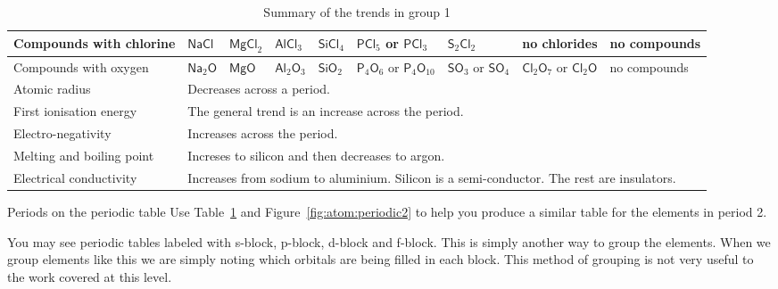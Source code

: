 \begin{table}[H]
 \begin{center}
  \begin{tabular}{|p{2cm}|l|l|l|l|l|l|l|l|} \hline
   Compounds with chlorine & $\mathsf{NaCl}$ & $\mathsf{MgCl}_2$ & $\mathsf{AlCl}_{3}$ & $\mathsf{SiCl}_{4}$ & $\mathsf{PCl}_{5}$ or $\mathsf{PCl}_{3}$ & $\mathsf{S}_{2}\mathsf{Cl}_{2}$ & no chlorides & no compounds \\ \hline
Compounds with oxygen & $\mathsf{Na}_{2}\mathsf{O}$ & $\mathsf{MgO}$ & $\mathsf{Al}_{2}\mathsf{O}_{3}$ & $\mathsf{SiO}_{2}$ & $\mathsf{P}_{4}\mathsf{O}_{6}$ or $\mathsf{P}_{4}\mathsf{O}_{10}$ & $\mathsf{SO}_{3}$ or $\mathsf{SO}_{4}$ & $\mathsf{Cl}_{2}\mathsf{O}_{7}$ or $\mathsf{Cl}_{2}\mathsf{O}$ & no compounds \\ \hline
Atomic radius & \multicolumn{8}{p{8cm}|}{Decreases across a period.} \\ \hline
First ionisation energy & \multicolumn{8}{p{8cm}|}{The general trend is an increase across the period.} \\ \hline
Electro-negativity & \multicolumn{8}{p{8cm}|}{Increases across the period.} \\ \hline
Melting and boiling point & \multicolumn{8}{p{8cm}|}{Increses to silicon and then decreases to argon.} \\ \hline
Electrical conductivity & \multicolumn{8}{p{8cm}|}{Increases from sodium to aluminium. Silicon is a semi-conductor. The rest are insulators.} \\ \hline
  \end{tabular}
\caption{Summary of the trends in group 1}
\label{tab:period3trends}
 \end{center}

\end{table}
\begin{exercises}{Periods on the periodic table}
Use Table~\ref{tab:period3trends} and Figure~\ref{fig:atom:periodic2} to help you produce a similar table for the elements in period 2.	
\end{exercises}
\label{m38760*eip-293}You may see periodic tables labeled with s-block, p-block, d-block and f-block. This is simply another way to group the elements. When we group elements like this we are simply noting which orbitals are being filled in each block. This method of grouping is not very useful to the work covered at this level.\par 
